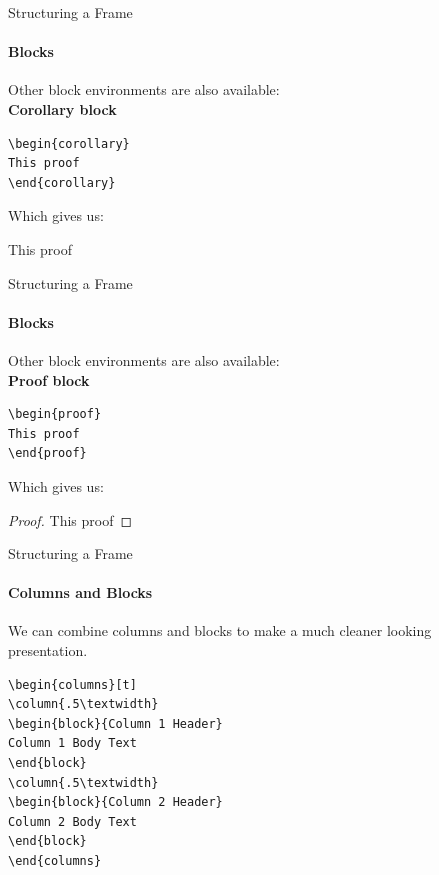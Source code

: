 \documentclass{bredelebeamer}
\begin{document}
\begin{frame}[fragile]{Structuring a Frame}\framesubtitle{Blocks}
Other block environments are also available:\\
\textbf{Corollary block}	
\begin{center}
\begin{verbatim}
\begin{corollary}
This proof
\end{corollary}
\end{verbatim}
\end{center}
\alert{Which gives us}:\\
\begin{corollary}
This proof
\end{corollary}
\end{frame}

\begin{frame}[fragile]{Structuring a Frame}\framesubtitle{Blocks}
Other block environments are also available:\\
\textbf{Proof block}	
\begin{center}
\begin{verbatim}
\begin{proof}
This proof
\end{proof}
\end{verbatim}
\end{center}
\alert{Which gives us}:\\
\begin{proof}
This proof
\end{proof}
\end{frame}

\begin{frame}[fragile]{Structuring a Frame}\framesubtitle{Columns and Blocks}

We can combine columns and blocks to make a much cleaner looking
presentation.
\begin{center}
\begin{verbatim}
\begin{columns}[t]
\column{.5\textwidth}
\begin{block}{Column 1 Header}
Column 1 Body Text
\end{block}
\column{.5\textwidth}
\begin{block}{Column 2 Header}
Column 2 Body Text
\end{block}
\end{columns}
\end{verbatim}
\end{center}


\end{frame}
\end{document}
